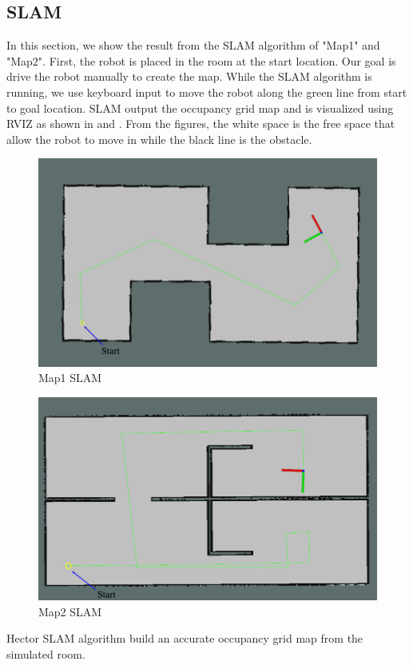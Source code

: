 \subsection{SLAM}
\hspace{1.27cm}
In this section, we show the result from the SLAM algorithm of "Map1" and "Map2". First, the robot is placed in the room at the start location. Our goal is drive the robot manually to create the map. While the SLAM algorithm is running, we use keyboard input to move the robot along the green line from start to goal location. SLAM output the occupancy grid map and is visualized using RVIZ as shown in \textbf{\figureautorefname{ \ref{fig:Map1 SLAM}}} and \textbf{\figureautorefname{ \ref{fig:Map2 SLAM}}}. From the figures, the white space is the free space that allow the robot to move in while the black line is the obstacle.\par
\begin{figure}[H]
	\centering
	\includegraphics[scale=0.80]{images/imagess/7reslt-slam-map1.pdf}
	\caption{Map1 SLAM}
	\label{fig:Map1 SLAM}
\end{figure}

\begin{figure}[H]
	\centering
	\includegraphics[scale=0.80]{images/imagess/7reslt-slam-map2.pdf}
	\caption{Map2 SLAM}
	\label{fig:Map2 SLAM}
\end{figure}
Hector SLAM algorithm build an accurate occupancy grid map from the simulated room.



